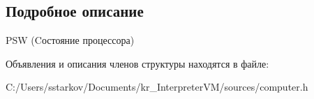 \subsection{Подробное описание}
P\+SW (Cостояние процессора) 

Объявления и описания членов структуры находятся в файле\+:\begin{DoxyCompactItemize}
\item 
C\+:/\+Users/sstarkov/\+Documents/kr\+\_\+\+Interpreter\+V\+M/sources/computer.\+h\end{DoxyCompactItemize}
